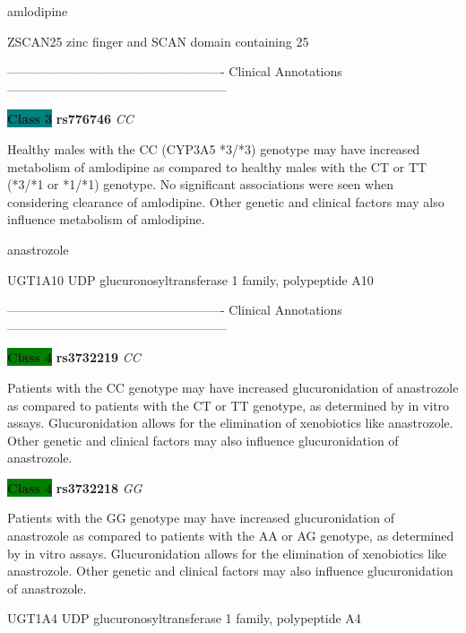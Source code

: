 \documentclass{resume} %
\begin{document}
\begin{rSection}{ amlodipine }
\begin{rSubsection}{ ZSCAN25 }{ zinc finger and SCAN domain containing 25 }{}{}
\item[] ---------------------------------------------------- Clinical Annotations -----------------------------------------------------\newline
\item \textbf{\colorbox{teal} {Class 3}} \textbf{ rs776746 } \textit{ CC }
\item[] Healthy males with the CC (CYP3A5 *3/*3) genotype may have increased metabolism of amlodipine as compared to healthy males with the CT or TT (*3/*1 or *1/*1) genotype. No significant associations were seen when considering clearance of amlodipine. Other genetic and clinical factors may also influence metabolism of amlodipine.
\end{rSubsection}

\end{rSection}\begin{rSection}{ anastrozole }
\item[]

\begin{rSubsection}{ UGT1A10 }{ UDP glucuronosyltransferase 1 family, polypeptide A10 }{}{}
\item[]

\item[] ---------------------------------------------------- Clinical Annotations -----------------------------------------------------\newline
\item \textbf{\colorbox{green} {Class 4}} \textbf{ rs3732219 } \textit{ CC }
\item[] Patients with the CC genotype may have increased glucuronidation of anastrozole as compared to patients with the CT or TT genotype, as determined by in vitro assays. Glucuronidation allows for the elimination of xenobiotics like anastrozole. Other genetic and clinical factors may also influence glucuronidation of anastrozole. \item \textbf{\colorbox{green} {Class 4}} \textbf{ rs3732218 } \textit{ GG }
\item[] Patients with the GG genotype may have increased glucuronidation of anastrozole as compared to patients with the AA or AG genotype, as determined by in vitro assays. Glucuronidation allows for the elimination of xenobiotics like anastrozole. Other genetic and clinical factors may also influence glucuronidation of anastrozole.
\end{rSubsection}\begin{rSubsection}{ UGT1A4 }{ UDP glucuronosyltransferase 1 family, polypeptide A4 }{}{}
\item[]


\end{rSubsection}
\end{rSection}
\end{document}
